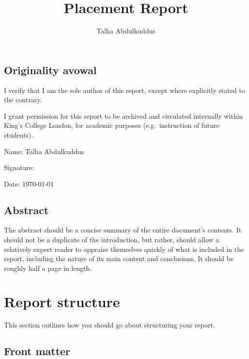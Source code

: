 \documentclass[british,12pt,a4paper]{report}
\begin{document}
\title{Placement Report}
\author{Talha Abdulkuddus}


\setcounter{page}{2} %

\vfill

\section*{Originality avowal}

I verify that I am the sole author of this report, except where explicitly
stated to the contrary.

I grant permission for this report to be archived and circulated
internally within King's College London, for academic purposes
(e.g.\ instruction of future students).

\bigskip

Name: Talha Abdulkuddus

\medskip

Signature:


\medskip

Date: \today

\vfill

\section*{Abstract}

The abstract should be a concise summary of the entire document's contents.
It should not be a duplicate of the introduction, but rather,
should allow a relatively expert reader to appraise themselves quickly
of what is included in the report,
including the nature of its main content and conclusions.
It should be roughly half a page in length.

\vfill

\tableofcontents



\chapter{Report structure}

This section outlines how you should go about structuring your report.

\section{Front matter}
\end{document}

